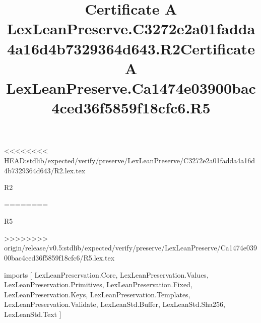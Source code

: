 <<<<<<<< HEAD:stdlib/expected/verify/preserve/LexLeanPreserve/C3272e2a01fadda4a16d4b7329364d643/R2.lex.tex
\begin{lexlean}{R2}
\title{Certificate A LexLeanPreserve.C3272e2a01fadda4a16d4b7329364d643.R2}
========
\begin{lexlean}{R5}
\title{Certificate A LexLeanPreserve.Ca1474e03900bac4ced36f5859f18cfc6.R5}
>>>>>>>> origin/release/v0.5:stdlib/expected/verify/preserve/LexLeanPreserve/Ca1474e03900bac4ced36f5859f18cfc6/R5.lex.tex
\begin{coremodule}
imports [
  LexLeanPreservation.Core,
  LexLeanPreservation.Values,
  LexLeanPreservation.Primitives,
  LexLeanPreservation.Fixed,
  LexLeanPreservation.Keys,
  LexLeanPreservation.Templates,
  LexLeanPreservation.Validate,
  LexLeanStd.Buffer,
  LexLeanStd.Sha256,
  LexLeanStd.Text
]


\end{coremodule}
\end{lexlean}
\end{lexlean}
